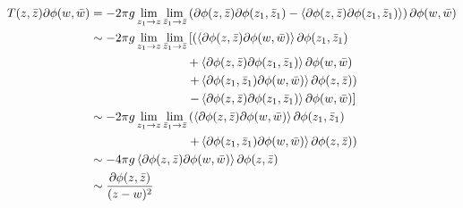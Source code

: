 \documentclass[10pt]{article}
\begin{document}
\begin{subequations}
    \begin{align}
        T(z,\bar{z})\partial\phi(w,\bar{w}) & =-2\pi g\lim_{z_1\to z}\lim_{\bar{z}_1\to\bar{z}}\left(\partial\phi(z,\bar{z})\partial\phi(z_1,\bar{z}_1)-\expval{\partial\phi(z,\bar{z})\partial\phi(z_1,\bar{z}_1)}\right)\partial\phi(w,\bar{w})\notag \\
                                            & \sim -2\pi g\lim_{z_1\to z}\lim_{\bar{z}_1\to\bar{z}}\left[\left(\expval{\partial\phi(z,\bar{z})\partial\phi(w,\bar{w})}\partial\phi(z_1,\bar{z}_1)\right.\right.\notag                                   \\
                                            & \quad\quad\quad\quad\quad\quad\quad\quad+\expval{\partial\phi(z,\bar{z})\partial\phi(z_1,\bar{z}_1)}\partial\phi(w,\bar{w})\notag                                                                         \\
                                            & \left.\quad\quad\quad\quad\quad\quad\quad\quad+\expval{\partial\phi(z_1,\bar{z}_1)\partial\phi(w,\bar{w})}\partial\phi(z,\bar{z})\right)\notag                                                            \\
                                            & \quad\quad\quad\quad\quad\quad\quad\quad\left.-\expval{\partial\phi(z,\bar{z})\partial\phi(z_1,\bar{z}_1)}\partial\phi(w,\bar{w})\right]\notag                                                            \\
                                            & \sim -2\pi g\lim_{z_1\to z}\lim_{\bar{z}_1\to\bar{z}}\left(\expval{\partial\phi(z,\bar{z})\partial\phi(w,\bar{w})}\partial\phi(z_1,\bar{z}_1)\right.\notag                                                \\
                                            & \quad\quad\quad\quad\quad\quad\quad\quad\left.+\expval{\partial\phi(z_1,\bar{z}_1)\partial\phi(w,\bar{w})}\partial\phi(z,\bar{z})\right)\notag                                                            \\
                                            & \sim -4\pi g\expval{\partial\phi(z,\bar{z})\partial\phi(w,\bar{w})}\partial\phi(z,\bar{z})\label{eq:2dcft:boson_OPE:T_partial_phi_1}                                                                      \\
                                            & \sim \frac{\partial\phi(z,\bar{z})}{(z-w)^2}\label{eq:2dcft:boson_OPE:T_partial_phi_final}
    \end{align}
\end{subequations}
\end{document}

